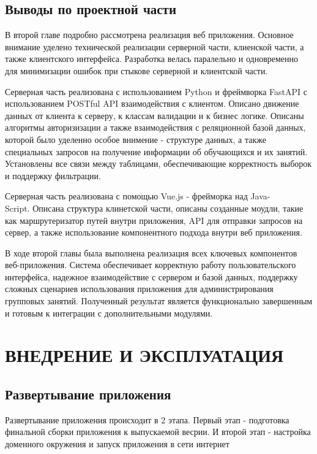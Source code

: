 \documentclass[a4paper,14pt,oneside]{extreport}
\begin{document}
\section {Выводы по проектной части}

В второй главе подробно рассмотрена реализация веб приложения. Основное внимание уделено технической реализации серверной части, клиенской части, а также клиентского интерфейса. 
Разработка велась паралельно и одновременно для минимизации ошибок при стыкове серверной и клиентской части.

Серверная часть реализована с использованием Python и фреймворка FastAPI с использованием POSTful API взаимодействия с клиентом. Описано движение данных от клиента к серверу, к классам валидации и к бизнес логике. Описаны алгоритмы авторизизации а также взаимодействия с реляционной базой данных, которой было уделенно особое внимение - структуре данных, а также специальных запросов на получение информации об обучающихся и их занятий. Установлены все связи между таблицами, обеспечивающие корректность выборок и поддержку фильтрации.

Серверная часть реализована с помощью Vue.js - фрейморка над Java-\\Script. Описана структура клинетской части, описаны созданные моудли, такие как маршрутеризатор путей внутри приложения, API для отправки запросов на сервер, а также использование компонентного подхода внутри веб приложения.

В ходе второй главы была выполнена реализация всех ключевых компонентов веб-приложения. Система обеспечивает корректную работу пользовательского интерфейса, надежное взаимодействие с сервером и базой данных, поддержку сложных сценариев использования приложения для администрирования групповых занятий. Полученный результат является функционально завершенным и готовым к интеграции с дополнительными модулями.

\newpage
\chapter{ВНЕДРЕНИЕ И ЭКСПЛУАТАЦИЯ}
\section {Развертывание приложения}

Развертывание приложения происходит в 2 этапа. Первый этап - подготовка финальной сборки приложения к выпускаемой весрии. И второй этап - настройка доменного окружения и запуск приложения в сети интернет
\end{document}
